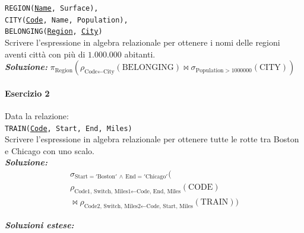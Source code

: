 \documentclass[12pt]{extarticle}
\begin{document}
\noindent \texttt{REGION(\underline{Name}, Surface), \\CITY(\underline{Code}, Name, Population), \\BELONGING(\underline{Region}, \underline{City})}\\

\noindent Scrivere l'espressione in algebra relazionale per ottenere i nomi delle regioni aventi città con più di $1.000.000$ abitanti.\\

\noindent \textbf{\textit{Soluzione:}} $\pi_{\text{Region}}(\rho_{\text{Code} \leftarrow \text{City}}(\text{BELONGING}) \bowtie \sigma_{\text{Population} > 1000000}(\text{CITY}))$

\paragraph{Esercizio 2} Data la relazione:\\

\noindent \texttt{TRAIN(\underline{Code}, Start, End, Miles)}\\

\noindent Scrivere l'espressione in algebra relazionale per ottenere tutte le rotte tra Boston e Chicago con uno scalo.\\

\noindent \textbf{\textit{Soluzione:}}
\[
\begin{gathered}
\sigma_{\text{Start} = '\text{Boston}' \,\land\, \text{End} = '\text{Chicago}'} \Big( \\
\rho_{\text{Code1, Switch, Miles1} \leftarrow \text{Code, End, Miles}}(\text{CODE}) \\
{}\bowtie \rho_{\text{Code2, Switch, Miles2} \leftarrow \text{Code, Start, Miles}}(\text{TRAIN}) \Big)
\end{gathered}
\]

\noindent \textbf{\textit{Soluzioni estese:}}
\end{document}
